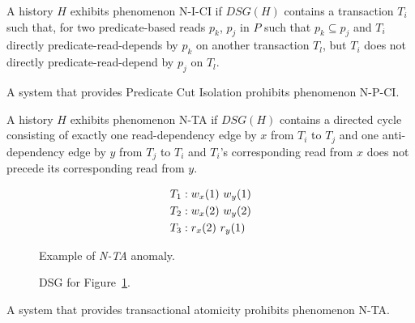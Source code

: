 \begin{definition}
A history $H$ exhibits phenomenon N-I-CI if $DSG(H)$ contains a
transaction $T_i$ such that, for two predicate-based reads $p_k$,
$p_j$ in $P$ such that $p_k \subseteq p_j$ and $T_i$ directly
predicate-read-depends by $p_k$ on another transaction $T_l$, but
$T_i$ does not directly predicate-read-depend by $p_j$ on $T_l$.
\end{definition}

\begin{definition}
A system that provides Predicate Cut Isolation prohibits phenomenon N-P-CI.
\end{definition}

\begin{definition}
A history $H$ exhibits phenomenon N-TA if $DSG(H)$ contains a directed cycle
consisting of exactly one read-dependency edge by $x$ from $T_i$ to
$T_j$ and one anti-dependency edge by $y$ from $T_j$ to $T_i$ and
$T_i$'s corresponding read from $x$ does not precede its corresponding
read from $y$.
\end{definition}


\begin{figure}[H]
\begin{align*}
\small
T_1 &: w_x(1)~w_y(1)\\
T_2 &: w_x(2)~w_y(2)\\
T_3 &: r_x(2)~r_y(1)
\end{align*}
\caption{Example of \textit{N-TA} anomaly.}
\label{fig:nta-history}
\end{figure}

\begin{figure}[H]
\centering
{}
\caption{DSG for Figure~\ref{fig:nta-history}.}
\label{fig:nta-dsg}
\end{figure}

\begin{definition}
A system that provides transactional atomicity prohibits phenomenon
N-TA.
\end{definition}

